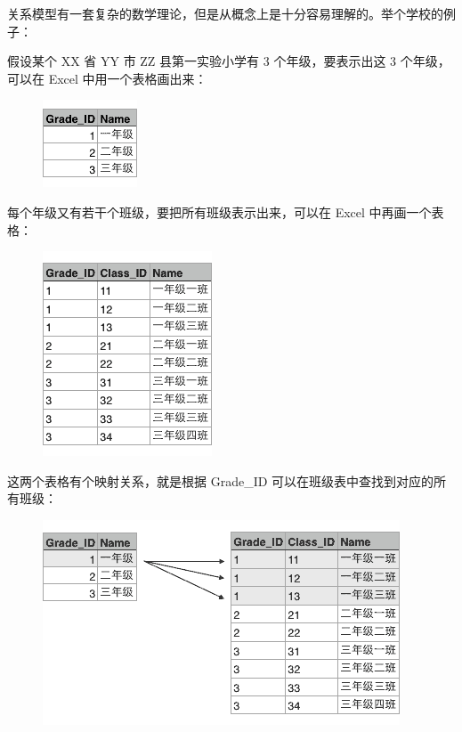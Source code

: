 关系模型有一套复杂的数学理论，但是从概念上是十分容易理解的。举个学校的例子：

假设某个 XX 省 YY 市 ZZ 县第一实验小学有 3 个年级，要表示出这 3
个年级，可以在 Excel 中用一个表格画出来：

 
 \begin{figure}[htp]
	\centering
	\includegraphics[width=0.6\linewidth]{fig/9466582752136320.png}
\end{figure}


每个年级又有若干个班级，要把所有班级表示出来，可以在 Excel
中再画一个表格：

 
 \begin{figure}[htp]
	\centering
	\includegraphics[width=0.6\linewidth]{fig/9466583066904000.png}
\end{figure}


这两个表格有个映射关系，就是根据 Grade\_ID
可以在班级表中查找到对应的所有班级：

 
 \begin{figure}[htp]
	\centering
	\includegraphics[width=0.6\linewidth]{fig/9466584239922880.png}
\end{figure}


